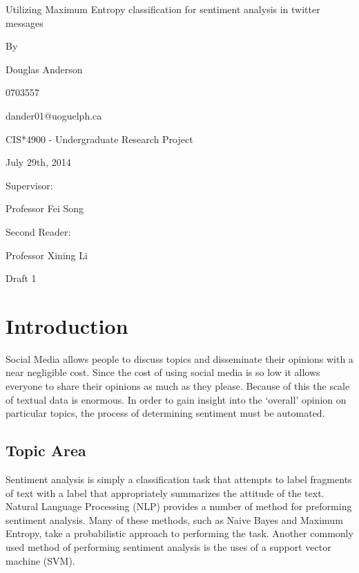 \documentclass[12pt]{article}
\begin{document}
\thispagestyle{empty}
\begin{center}

\huge

Utilizing Maximum Entropy classification for sentiment analysis in twitter
messages

\large
\vspace{2.0cm}
By

\vspace{1.0cm}
Douglas Anderson

0703557

dander01@uoguelph.ca

\vspace{1.5cm}
CIS*4900 - Undergraduate Research Project

July 29th, 2014 %


\vspace{1.5cm}

Supervisor:

Professor Fei Song

\vspace{1.5cm}

Second Reader:

Professor Xining Li

\vspace{1.5cm}

Draft 1 %

\end{center}


\newpage
\pagestyle{headings}
\setcounter{page}{1}

\section{Introduction}

Social Media allows people to discuss topics and disseminate their opinions
with a near negligible cost. Since the cost of using social media is so low it
allows everyone to share their opinions as much as they please. Because of this
the scale of textual data is enormous. In order to gain insight into the
`overall' opinion on particular topics, the process of determining sentiment
must be automated.

\subsection{Topic Area}

Sentiment analysis is simply a classification task that attempts to label
fragments of text with a label that appropriately summarizes the attitude of
the text. Natural Language Processing (NLP) provides a number of method for
preforming sentiment analysis. Many of these methods, such as Naive Bayes and
Maximum Entropy, take a probabilistic approach to performing the task. Another
commonly used method of performing sentiment analysis is the uses of a support
vector machine (SVM).
\end{document}
